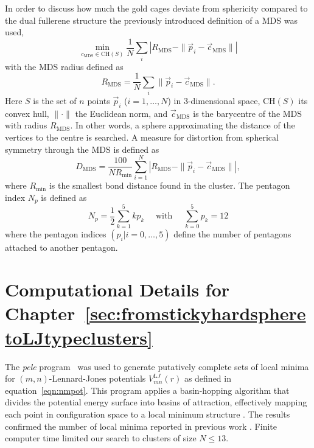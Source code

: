 In order to discuss how much the gold cages deviate from sphericity compared to
the dual fullerene structure the previously introduced definition of a \ac{MDS}
was used,\autocite{Schwerdtfeger_Programfullerenesoftware_2013}
%
\begin{equation} 
\min\limits_{c_\mathrm{MDS} \in \mathrm{CH}(S)} \frac{1}{N} \sum _{i} \left|R_\mathrm{MDS} -\| \vec{p}_{i}-\vec{c}_\mathrm{MDS} \| \right|  
\end{equation}
with the \ac{MDS} radius defined as
\begin{equation} 
	R_{\mathrm{MDS}} =\frac{1}{N} \sum _{i}\| \vec{p}_{i} -\vec{c}_{\mathrm{MDS}} \|. 
	\label{eq:RMDS}
\end{equation}
%
Here $S$ is the set of $n$ points $\vec{p}_i$ ($i=1,\ldots ,N$) in
$3$-dimensional space, $\mathrm{CH}(S)$ its convex hull, $\|\cdot\| $ the
Euclidean norm, and $\vec{c}_\mathrm{MDS}$ is the barycentre of the \ac{MDS}
with radius $R_\mathrm{MDS}$. In other words, a sphere approximating the
distance of the vertices to the centre is searched. A measure
for distortion from spherical symmetry through the
\ac{MDS} is defined as\autocite{Schwerdtfeger_Programfullerenesoftware_2013}
%
\begin{equation}
  \label{eq:DMDS}
  D_{\mathrm{MDS}} = \frac{100}{N R_\mathrm{min}} \sum_{i=1}^N \left|R_{\mathrm{MDS}} - \|\vec{p}_i - \vec{c}_{\mathrm{MDS}}\| \right|,
\end{equation}
where $R_\mathrm{min}$ is the smallest bond distance found in the cluster. The pentagon index $N_p$ is defined as
\begin{equation}
  \label{pentindex}
  N_p = \frac{1}{2}\sum_{k=1}^{5} kp_k \quad \text{ with } \quad  \sum_{k=0}^{5} p_k = 12
\end{equation}
%
where the pentagon indices $(p_i | i=0, \dots , 5)$ define the number of
pentagons attached to another pentagon.\autocite{Fowler-atlas-2006}

\section{Computational Details for Chapter~\ref{sec:fromstickyhardspheretoLJtypeclusters}}

The \textit{pele} program~\autocite{_pelePythonenergy_2017} was used to generate putatively
complete sets of local minima for $(m,n)$-Lennard-Jones potentials 
$V_{mn}^{\mathrm LJ}(r)$ as defined in equation~\eqref{eqn:nmpot}.
This program  applies a basin-hopping algorithm that divides the potential energy
surface into basins of attraction, effectively mapping each point in
configuration space to a local minimum structure
\autocite{lis87,waless99,Wales_GlobalOptimizationBasinHopping_1997}.  The results confirmed the
number of local minima reported in previous work \autocite{Doye_Saddlepointsdynamics_2002}.
Finite computer time limited our search to clusters of size $N \leq 13$.

